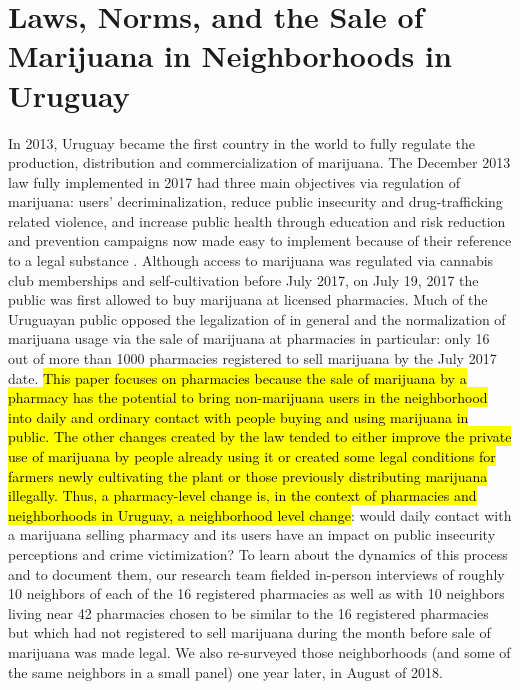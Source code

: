 \documentclass[11pt]{article}
\begin{document}
\section[]{Laws, Norms, and the Sale of Marijuana in Neighborhoods in Uruguay}

In 2013, Uruguay became the first country in the world to fully regulate the production, distribution and commercialization of marijuana. The December 2013 law fully implemented in 2017 had three main objectives via  regulation of marijuana:  users' decriminalization, reduce public insecurity and drug-trafficking related violence, and increase public health through education and risk reduction and prevention campaigns now made easy to implement because of their reference to a legal substance \citep{arraras2014inventando, pardo2014cannabis, queirolo2019uruguay}. Although access to marijuana was regulated via cannabis club memberships and self-cultivation before July 2017, on July 19, 2017 the public was first allowed to buy marijuana at licensed pharmacies. Much of the Uruguayan public opposed the legalization of in general and the normalization of marijuana usage via the sale of marijuana at pharmacies in particular: only 16 out of more than 1000 pharmacies registered to sell marijuana by the July 2017 date. \hl{This paper focuses on pharmacies because the sale of marijuana by a pharmacy has the potential to bring non-marijuana users in the neighborhood into daily and ordinary contact with people buying and using marijuana in public. The other changes created by the law tended to either improve the private use of marijuana by people already using it or created some legal conditions for farmers newly cultivating the plant or those previously distributing marijuana illegally. Thus, a pharmacy-level change is, in the context of pharmacies and neighborhoods in Uruguay, a neighborhood level change}: would daily contact with a marijuana selling pharmacy and its users have an impact on public insecurity perceptions and crime victimization? To learn about the dynamics of this process and to document them, our research team fielded in-person interviews of roughly 10 neighbors of each of the 16 registered pharmacies as well as with 10 neighbors living near 42 pharmacies chosen to be similar to the 16 registered pharmacies but which had not registered to sell marijuana during the month before sale of marijuana was made legal. We also re-surveyed those neighborhoods (and some  of the same neighbors in a small panel) one year later, in August of 2018.
\end{document}

